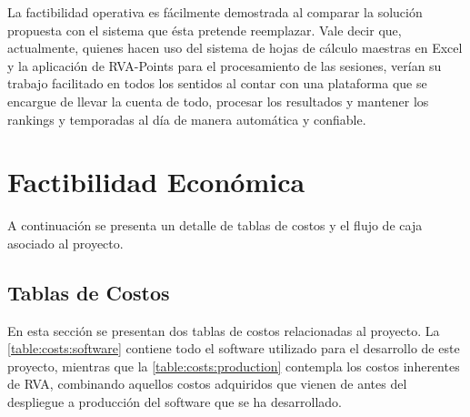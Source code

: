 La factibilidad operativa es fácilmente demostrada al comparar la solución propuesta con el sistema que ésta pretende reemplazar. Vale decir que, actualmente, quienes hacen uso del sistema de hojas de cálculo maestras en Excel y la aplicación de RVA-Points para el procesamiento de las sesiones, verían su trabajo facilitado en todos los sentidos al contar con una plataforma que se encargue de llevar la cuenta de todo, procesar los resultados y mantener los rankings y temporadas al día de manera automática y confiable.

\section{Factibilidad Económica}
A continuación se presenta un detalle de tablas de costos y el flujo de caja asociado al proyecto. 

\subsection{Tablas de Costos}
\label{feasibility:costs}
En esta sección se presentan dos tablas de costos relacionadas al proyecto. La \autoref{table:costs:software} contiene todo el software utilizado para el desarrollo de este proyecto, mientras que la \autoref{table:costs:production} contempla los costos inherentes de RVA, combinando aquellos costos adquiridos que vienen de antes del despliegue a producción del software que se ha desarrollado.

